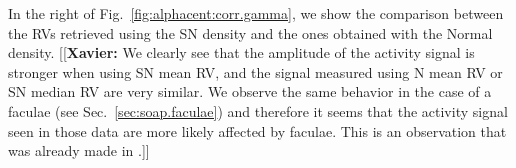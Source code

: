 \documentclass{aa}
\newcommand{\xavier}[1]{{\color{blue}[[\textbf{Xavier: }#1]]}}
\begin{document}
In the right of Fig.~\ref{fig:alphacent:corr.gamma}, we show the comparison between the RVs retrieved using the SN density and the ones obtained with the Normal density. \xavier{We clearly see that the amplitude of the activity signal is stronger when using SN mean RV, and the signal measured using N mean RV or SN median RV are very similar. We observe the same behavior in the case of a faculae (see Sec.~\ref{sec:soap.faculae}) and therefore it seems that the activity signal seen in those data are more likely affected by faculae. This is an observation that was already made in \citet{Dumusque-2014c}.}
%
\end{document}
